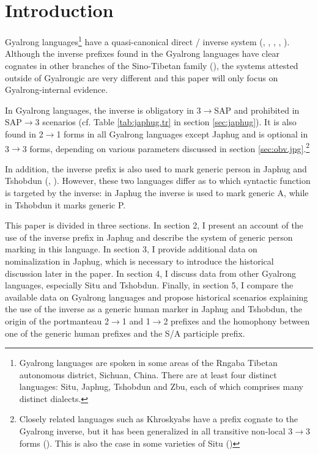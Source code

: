 \documentclass[oldfontcommands,oneside,a4paper,11pt]{article}
\begin{document}
\section{Introduction}
Gyalrong languages\footnote{Gyalrong languages are spoken in some areas of the Rngaba Tibetan autonomous district, Sichuan, China. There are at least four distinct languages: Situ, Japhug, Tshobdun and Zbu, each of which comprises many distinct dialects.} have a quasi-canonical direct / inverse system (\citealt{delancey81direction}, \citealt{jackson02rentongdengdi}, \citealt{jacques10inverse}, \citealt{gongxun14agreement}, \citealt{jacques14inverse}). Although the inverse prefixes found in the Gyalrong languages have  clear cognates  in other branches of the Sino-Tibetan family (\citealt{delancey10agreement}), the systems attested outside of Gyalrongic are very different and this paper will only focus on Gyalrong-internal evidence.

In Gyalrong languages, the inverse is obligatory in 3$\rightarrow$SAP and prohibited in SAP$\rightarrow$3 scenarios (cf. Table \ref{tab:japhug.tr} in section \ref{sec:japhug}). It is also found in  2$\rightarrow$1 forms in all Gyalrong languages except Japhug and is optional in 3$\rightarrow$3 forms, depending on various parameters discussed  in section \ref{sec:obv.jpg}.\footnote{Closely related languages such as Khroskyabs have a prefix cognate to the Gyalrong inverse, but it has been generalized in all transitive non-local 3$\rightarrow$3 forms (\citealt{lai15person}). This is also the case in some varieties of Situ (\citealt{jackson15sastod})}

In addition, the inverse prefix is also used to mark generic person in Japhug and Tshobdun  (\citealt{jacques12demotion}, \citealt{sun14generic}). However, these two languages differ as to which syntactic function is targeted by the inverse: in Japhug the inverse is used to mark generic A, while in Tshobdun it marks generic P. 

  This paper is divided in three sections. In section 2, I present an account of the use of the inverse prefix in Japhug and describe the system of generic person marking in this language. In section 3, I provide additional data on nominalization in Japhug, which is necessary to introduce the historical discussion later in the paper. In section 4, I discuss data from other Gyalrong languages, especially Situ and Tshobdun. Finally, in section 5, I compare the available data on Gyalrong languages and propose historical scenarios explaining the use of the inverse as a generic human marker in Japhug and Tshobdun, the origin of the portmanteau 2$\rightarrow$1 and 1$\rightarrow$2 prefixes and the homophony between one of the generic human prefixes and the S/A participle prefix.
  
\end{document}
